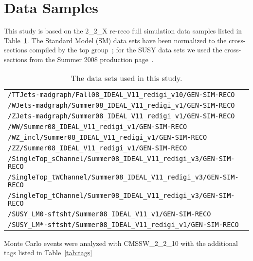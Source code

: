 \section{Data Samples}
\label{sec:datasamples}
This study is based on the 2\_2\_X re-reco full simulation data samples
listed in Table~\ref{tab:datasets}.  The Standard Model (SM) data sets have been normalized 
to the cross-sections compiled by the top group~\cite{tosi};  for the SUSY 
data sets we used the cross-sections from the Summer 2008 production 
page~\cite{summer08}.

\begin{table}[hbt]
\begin{center}
\begin{tabular}{|l|}\hline
{\tt /TTJets-madgraph/Fall08\_IDEAL\_V11\_redigi\_v10/GEN-SIM-RECO} \\
{\tt /WJets-madgraph/Summer08\_IDEAL\_V11\_redigi\_v1/GEN-SIM-RECO} \\
{\tt /ZJets-madgraph/Summer08\_IDEAL\_V11\_redigi\_v1/GEN-SIM-RECO} \\
{\tt /WW/Summer08\_IDEAL\_V11\_redigi\_v1/GEN-SIM-RECO} \\
{\tt /WZ\_incl/Summer08\_IDEAL\_V11\_redigi\_v1/GEN-SIM-RECO} \\
{\tt /ZZ/Summer08\_IDEAL\_V11\_redigi\_v1/GEN-SIM-RECO} \\
{\tt /SingleTop\_sChannel/Summer08\_IDEAL\_V11\_redigi\_v3/GEN-SIM-RECO} \\
{\tt /SingleTop\_tWChannel/Summer08\_IDEAL\_V11\_redigi\_v3/GEN-SIM-RECO} \\
{\tt /SingleTop\_tChannel/Summer08\_IDEAL\_V11\_redigi\_v3/GEN-SIM-RECO} \\
{\tt /SUSY\_LM0-sftsht/Summer08\_IDEAL\_V11\_v1/GEN-SIM-RECO} \\
{\tt /SUSY\_LM*-sftsht/Summer08\_IDEAL\_V11\_redigi\_v1/GEN-SIM-RECO} \\
\hline
\end{tabular}
\caption{The data sets used in this study.\label{tab:datasets}}
\end{center}
\end{table}

Monte Carlo events were analyzed with CMSSW\_2\_2\_10 
with the additional tags listed in Table~\ref{tab:tags}

